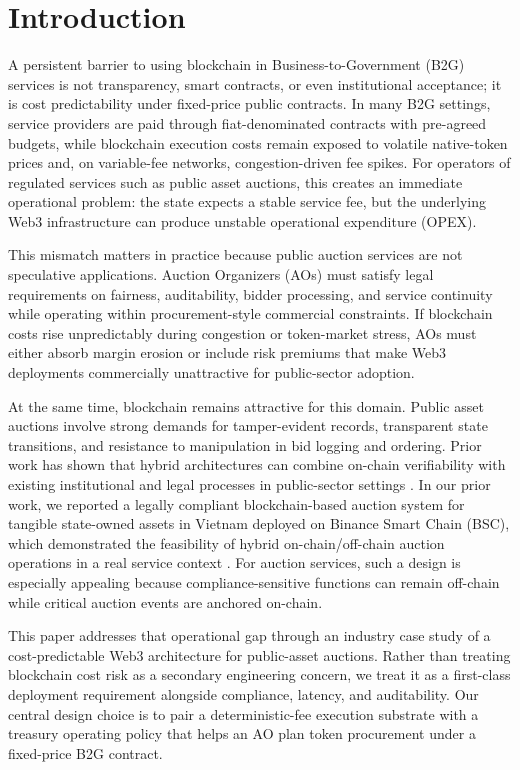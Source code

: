 \documentclass[runningheads]{llncs}
\begin{document}
\section{Introduction}

A persistent barrier to using blockchain in Business-to-Government (B2G) services is not transparency, smart contracts, or even institutional acceptance; it is cost predictability under fixed-price public contracts. In many B2G settings, service providers are paid through fiat-denominated contracts with pre-agreed budgets, while blockchain execution costs remain exposed to volatile native-token prices and, on variable-fee networks, congestion-driven fee spikes. For operators of regulated services such as public asset auctions, this creates an immediate operational problem: the state expects a stable service fee, but the underlying Web3 infrastructure can produce unstable operational expenditure (OPEX).

This mismatch matters in practice because public auction services are not speculative applications. Auction Organizers (AOs) must satisfy legal requirements on fairness, auditability, bidder processing, and service continuity while operating within procurement-style commercial constraints. If blockchain costs rise unpredictably during congestion or token-market stress, AOs must either absorb margin erosion or include risk premiums that make Web3 deployments commercially unattractive for public-sector adoption.

At the same time, blockchain remains attractive for this domain. Public asset auctions involve strong demands for tamper-evident records, transparent state transitions, and resistance to manipulation in bid logging and ordering. Prior work has shown that hybrid architectures can combine on-chain verifiability with existing institutional and legal processes in public-sector settings \cite{Akaba2020,Baranwal2020,Alqodsi2025}. In our prior work, we reported a legally compliant blockchain-based auction system for tangible state-owned assets in Vietnam deployed on Binance Smart Chain (BSC), which demonstrated the feasibility of hybrid on-chain/off-chain auction operations in a real service context \cite{ref_Le2026DAS}. For auction services, such a design is especially appealing because compliance-sensitive functions can remain off-chain while critical auction events are anchored on-chain.

This paper addresses that operational gap through an industry case study of a cost-predictable Web3 architecture for public-asset auctions. Rather than treating blockchain cost risk as a secondary engineering concern, we treat it as a first-class deployment requirement alongside compliance, latency, and auditability. Our central design choice is to pair a deterministic-fee execution substrate with a treasury operating policy that helps an AO plan token procurement under a fixed-price B2G contract.
\end{document}
